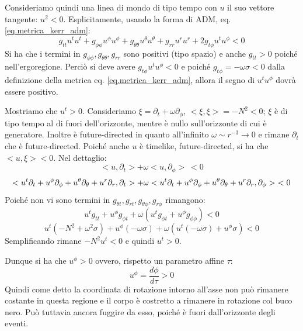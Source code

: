 Consideriamo quindi una linea di mondo di tipo tempo con $u$ il suo vettore tangente: $u^2 < 0$.
Esplicitamente, usando la forma di ADM, eq. \ref{eq.metrica_kerr_adm}:
\begin{equation*}
    g_{tt}u^tu^t + g_{\phi\phi}u^\phi u^\phi + g_{\theta\theta}u^\theta u^\theta + g_{rr}u^r u^r + 2g_{t\phi}u^t u^\phi < 0
\end{equation*}
Si ha che i termini in $g_{\phi\phi}, g_{\theta\theta}, g_{rr}$ sono positivi (tipo spazio) e anche $g_{tt} > 0$ poiché nell'ergoregione. Perciò si deve avere $g_{t\phi}u^t u^\phi < 0$ e poiché $g_{t\phi} = - \omega \sigma < 0$ dalla definizione della metrica eq. \ref{eq.metrica_kerr_adm}, allora il segno di $u^t u^\phi$ dovrà essere positivo. 

Mostriamo che $u^t > 0$.  Consideriamo $\xi = \partial_t + \omega \partial_\phi$, $< \xi, \xi > = -N^2 < 0$; $\xi$ è di tipo tempo al di fuori dell'orizzonte, mentre è nullo sull'orizzonte di cui è generatore. Inoltre è future-directed in quanto all'infinito $\omega \sim r^{-3} \rightarrow 0$ e rimane $\partial_t $ che è future-directed.
Poiché anche $u$ è timelike, future-directed, si ha che $< u, \xi > < 0$. Nel dettaglio:
\begin{equation*}
    <u, \partial_t > + \omega < u, \partial_\phi > \ < 0
\end{equation*}
\begin{equation*}
    < u^t \partial_t + u^\phi \partial_\phi + u^\theta \partial_\theta + u^r\partial_r, \partial_t > + \omega < u^t \partial_t + u^\phi \partial_\phi + u^\theta \partial_\theta + u^r\partial_r, \partial_\phi > \ < 0 \\
\end{equation*}
Poiché non vi sono termini in $g_{\theta t}, g_{rt}, g_{\theta\phi}, g_{r\phi}$ rimangono:
\begin{equation*}
    u^t g_{tt} + u^\phi g_{\phi t} + \omega( u^t g_{\phi t} + u^\phi g_{\phi\phi}) <0
\end{equation*}
\begin{equation*}
    u^t( -N^2 + \omega^2\sigma) +u^\phi(-\omega \sigma) +\omega( u^t(-\omega\sigma) + u^\phi\sigma) <  0
\end{equation*}
Semplificando rimane $-N^2 u^t < 0$ e quindi $u^t > 0$.

Dunque si ha che $u^\phi > 0$ ovvero, rispetto un parametro affine $\tau$:
\begin{equation*}
    u^\phi = \frac{d\phi}{d\tau} > 0
\end{equation*}
Quindi come detto la coordinata di rotazione intorno all'asse non può rimanere costante in questa regione e il corpo è costretto a rimanere in rotazione col buco nero. Può tuttavia ancora fuggire da esso, poiché è fuori dall'orizzonte degli eventi.

